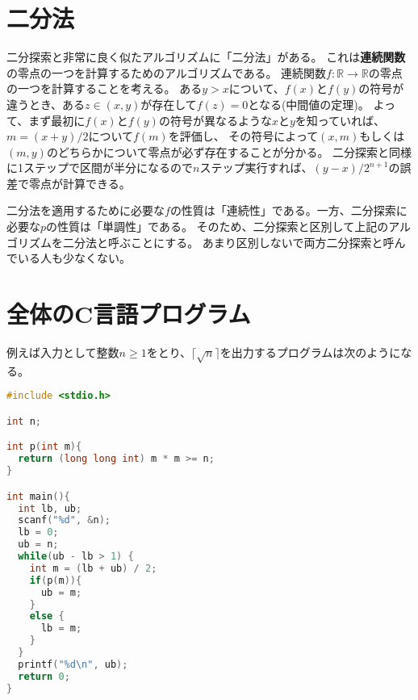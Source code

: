 \documentclass[a4paper,twoside,onecolumn,openany,article,10pt]{memoir}
\theoremstyle{remark}
\begin{document}
\section{二分法}
二分探索と非常に良く似たアルゴリズムに「二分法」がある。
これは\textbf{連続関数}の零点の一つを計算するためのアルゴリズムである。
連続関数$f\colon\mathbb{R}\to\mathbb{R}$の零点の一つを計算することを考える。
ある$y>x$について、$f(x)$と$f(y)$の符号が違うとき、ある$z\in(x,y)$が存在して$f(z)=0$となる(中間値の定理)。
よって、まず最初に$f(x)$と$f(y)$の符号が異なるような$x$と$y$を知っていれば、$m=(x+y)/2$について$f(m)$を評価し、
その符号によって$(x, m)$もしくは$(m, y)$のどちらかについて零点が必ず存在することが分かる。
二分探索と同様に1ステップで区間が半分になるので$n$ステップ実行すれば、$(y-x)/2^{n+1}$の誤差で零点が計算できる。

二分法を適用するために必要な$f$の性質は「連続性」である。一方、二分探索に必要な$p$の性質は「単調性」である。
そのため、二分探索と区別して上記のアルゴリズムを二分法と呼ぶことにする。
あまり区別しないで両方二分探索と呼んでいる人も少なくない。


\section{全体のC言語プログラム}

例えば入力として整数$n\ge 1$をとり、$\lceil\sqrt{n}\rceil$を出力するプログラムは次のようになる。
\begin{lstlisting}[basicstyle=\ttfamily\normalsize,showstringspaces=false,language=C,frame=single]
#include <stdio.h>

int n;

int p(int m){
  return (long long int) m * m >= n;
}

int main(){
  int lb, ub;
  scanf("%d", &n);
  lb = 0;
  ub = n;
  while(ub - lb > 1) {
    int m = (lb + ub) / 2;
    if(p(m)){
      ub = m;
    }
    else {
      lb = m;
    }
  }
  printf("%d\n", ub);
  return 0;
}
\end{lstlisting}
\end{document}
